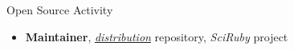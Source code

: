 \begin{rSection}{Open Source Activity}{}{}{}
\begin{itemize}
    \item {\textbf{Maintainer}, \textit{\href{https://github.com/SciRuby/distribution}{distribution}} repository, \textit{SciRuby} project}
\end{itemize}
\end{rSection}